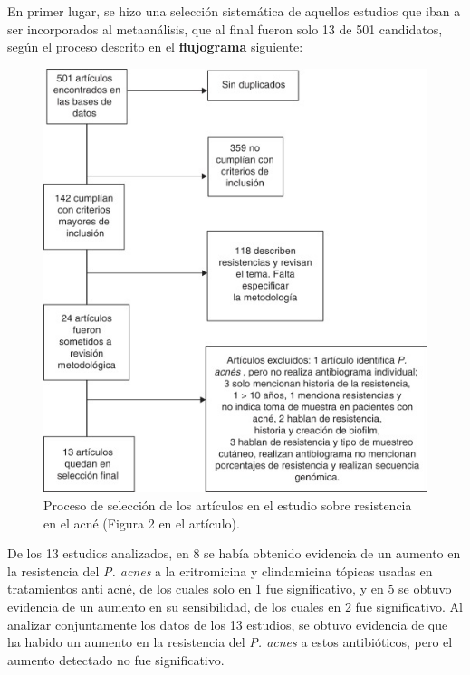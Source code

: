 \documentclass[
]{book}
\theoremstyle{definition}
\theoremstyle{definition}
\theoremstyle{definition}
\theoremstyle{definition}
\theoremstyle{remark}
\begin{document}
En primer lugar, se hizo una selección sistemática de aquellos estudios que iban a ser incorporados al metaanálisis, que al final fueron solo 13 de 501 candidatos, según el proceso descrito en el \textbf{flujograma} siguiente:

\begin{figure}

{\centering \includegraphics[width=0.9\linewidth]{INREMDN_files/figure-html/acne2} 

}

\caption{Proceso de selección de los artículos en el estudio sobre resistencia en el acné (Figura 2 en el artículo).}\label{fig:acne2}
\end{figure}

De los 13 estudios analizados, en 8 se había obtenido evidencia de un aumento en la resistencia del \emph{P. acnes} a la eritromicina y clindamicina tópicas usadas en tratamientos anti acné, de los cuales solo en 1 fue significativo, y en 5 se obtuvo evidencia de un aumento en su sensibilidad, de los cuales en 2 fue significativo. Al analizar conjuntamente los datos de los 13 estudios, se obtuvo evidencia de que ha habido un aumento en la resistencia del \emph{P. acnes} a estos antibióticos, pero el aumento detectado no fue significativo.
\end{document}
